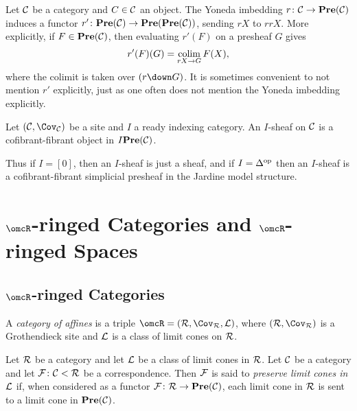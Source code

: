 \documentclass[10pt]{amsart}
\begin{document}
Let $\mathcal{C}$ be a category and $C\in\mathcal{C}$ an object.  The Yoneda imbedding $r\colon\mathcal{C}\rightarrow{\bf Pre}(\mathcal{C})$ induces a functor
$r'\colon{\bf Pre}(\mathcal{C})\rightarrow{\bf Pre}({\bf Pre}(\mathcal{C}))$, sending $rX$ to $rrX$.  More explicitly, if $F\in{\bf Pre}(\mathcal{C})$, then evaluating $r'(F)$ on a
presheaf $G$ gives $$r'(F)(G)=\mathop{\textnormal{colim}}_{rX\rightarrow G}F(X),$$ where the colimit is taken over $(r\down G)$.  It is sometimes convenient to
not mention $r'$ explicitly, just as one often does not mention the Yoneda imbedding explicitly.

\begin{definition}

Let $(\mcC,\Cov_\mcC)$ be a site and $I$ a ready indexing category.  An $I$-sheaf on $\mathcal{C}$ is a cofibrant-fibrant object in $I{\bf Pre}(\mathcal{C})$.

\end{definition}

Thus if $I=[0]$, then an $I$-sheaf is just a sheaf, and if $I=\Delta^\textnormal{op}$ then an $I$-sheaf is a cofibrant-fibrant simplicial presheaf in the Jardine model structure.

\section{$\omcR$-ringed Categories and $\omcR$-ringed Spaces}

\subsection{$\omcR$-ringed Categories}

\begin{definition}

A {\em category of affines} is a triple $\omcR=(\mcR,\Cov_\mcR,\mcL)$, where $(\mcR,\Cov_\mcR)$ is a Grothendieck site and $\mathcal{L}$ is a class of limit cones on $\mathcal{R}$.

\end{definition}

\begin{definition}

Let $\mathcal{R}$ be a category and let $\mathcal{L}$ be a class of limit cones in $\mathcal{R}$.  Let $\mathcal{C}$ be a category and let $\mathcal{F}\colon\mathcal{C}<\mathcal{R}$ be a correspondence.  Then $\mathcal{F}$ is said to {\em preserve limit cones in $\mathcal{L}$} if, when considered as a functor $\mathcal{F}\colon\mathcal{R}\rightarrow{\bf Pre}(\mathcal{C})$, each limit cone in $\mathcal{R}$ is sent to a limit cone in ${\bf Pre}(\mathcal{C})$.

\end{definition}
\end{document}
